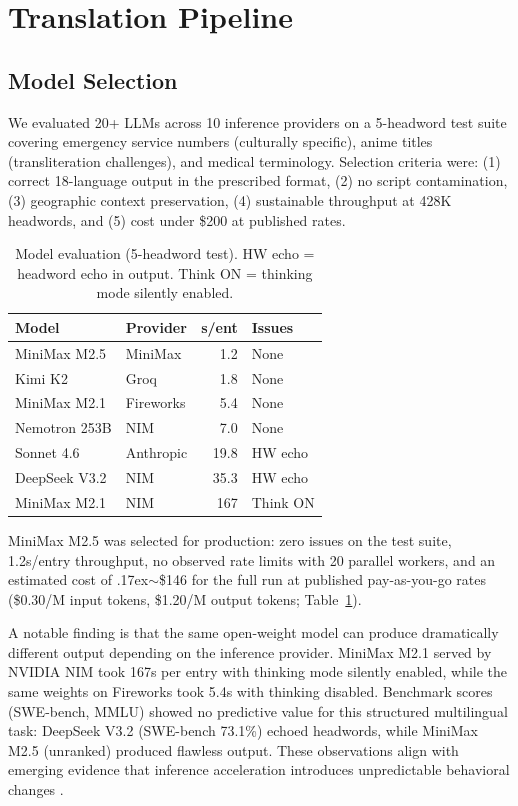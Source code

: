 \documentclass[11pt]{article}
\begin{document}
\section{Translation Pipeline}
\label{sec:pipeline}

\subsection{Model Selection}

We evaluated 20+ LLMs across 10 inference providers on a 5-headword test suite covering emergency service numbers (culturally specific), anime titles (transliteration challenges), and medical terminology. Selection criteria were: (1) correct 18-language output in the prescribed format, (2) no script contamination, (3) geographic context preservation, (4) sustainable throughput at 428K headwords, and (5) cost under \$200 at published rates.

\begin{table}[t]
\centering
\small
\begin{tabular}{llrl}
\toprule
\textbf{Model} & \textbf{Provider} & \textbf{s/ent} & \textbf{Issues} \\
\midrule
MiniMax M2.5  & MiniMax   & 1.2  & None \\
Kimi K2       & Groq      & 1.8  & None \\
MiniMax M2.1  & Fireworks & 5.4  & None \\
Nemotron 253B & NIM       & 7.0  & None \\
Sonnet 4.6    & Anthropic & 19.8 & HW echo \\
DeepSeek V3.2 & NIM       & 35.3 & HW echo \\
MiniMax M2.1  & NIM       & 167  & Think ON \\
\bottomrule
\end{tabular}
\caption{Model evaluation (5-headword test). HW echo = headword echo in output. Think ON = thinking mode silently enabled.}
\label{tab:models}
\end{table}

MiniMax M2.5 was selected for production: zero issues on the test suite, 1.2s/entry throughput, no observed rate limits with 20 parallel workers, and an estimated cost of {\raise.17ex\hbox{$\scriptstyle\sim$}}\$146 for the full run at published pay-as-you-go rates (\$0.30/M input tokens, \$1.20/M output tokens; Table~\ref{tab:models}).

A notable finding is that the same open-weight model can produce dramatically different output depending on the inference provider. MiniMax M2.1 served by NVIDIA NIM took 167s per entry with thinking mode silently enabled, while the same weights on Fireworks took 5.4s with thinking disabled. Benchmark scores (SWE-bench, MMLU) showed no predictive value for this structured multilingual task: DeepSeek V3.2 (SWE-bench 73.1\%) echoed headwords, while MiniMax M2.5 (unranked) produced flawless output. These observations align with emerging evidence that inference acceleration introduces unpredictable behavioral changes \citep{kirsten2025acceleration}.
\end{document}
